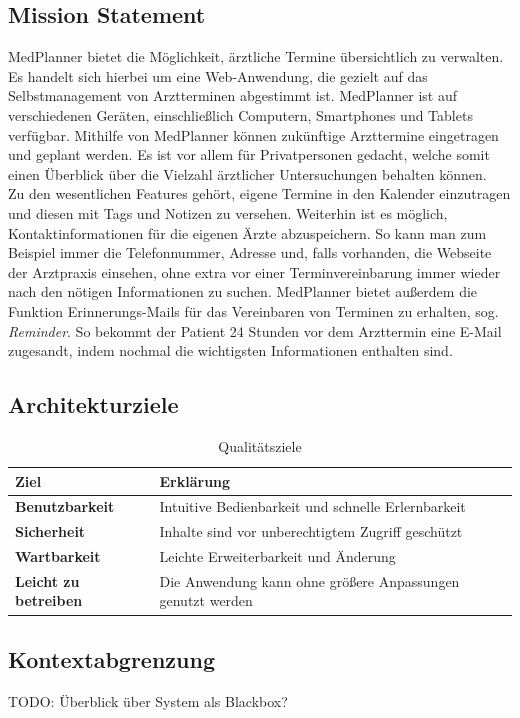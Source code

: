 \documentclass[conference]{IEEEtran}
\begin{document}
\subsection{Mission Statement}
MedPlanner bietet die Möglichkeit, ärztliche Termine übersichtlich zu verwalten. Es handelt sich hierbei um eine Web-Anwendung, die gezielt auf das Selbstmanagement von Arztterminen abgestimmt ist. MedPlanner ist auf verschiedenen Geräten, einschließlich Computern, Smartphones und Tablets verfügbar. Mithilfe von MedPlanner können zukünftige Arzttermine eingetragen und geplant werden. Es ist vor allem für Privatpersonen gedacht, welche somit einen Überblick über die Vielzahl ärztlicher Untersuchungen behalten können.\\
Zu den wesentlichen Features gehört, eigene Termine in den Kalender einzutragen und diesen mit Tags und Notizen zu versehen. Weiterhin ist es möglich, Kontaktinformationen für die eigenen Ärzte abzuspeichern. So kann man zum Beispiel immer die Telefonnummer, Adresse und, falls vorhanden, die Webseite der Arztpraxis einsehen, ohne extra vor einer Terminvereinbarung immer wieder nach den nötigen Informationen zu suchen. MedPlanner bietet außerdem die Funktion Erinnerungs-Mails für das Vereinbaren von Terminen zu erhalten, sog. \textit{Reminder}. So bekommt der Patient 24 Stunden vor dem Arzttermin eine E-Mail zugesandt, indem nochmal die wichtigsten Informationen enthalten sind. 


\subsection{Architekturziele}
\begin{table}[!h]
	\caption{Qualitätsziele}
	\begin{tabularx}{\columnwidth}{>{\bfseries}l|p{57mm}}
		\toprule
		\textbf{Ziel} & Erklärung\\
		\midrule
		Benutzbarkeit & Intuitive Bedienbarkeit und schnelle Erlernbarkeit\\
		Sicherheit & Inhalte sind vor unberechtigtem Zugriff geschützt\\
		Wartbarkeit & Leichte Erweiterbarkeit und Änderung\\
		Leicht zu betreiben & Die Anwendung kann ohne größere Anpassungen genutzt werden\\
		\bottomrule
	\end{tabularx}
\end{table}

\subsection{Kontextabgrenzung}
TODO: Überblick über System als Blackbox?
\end{document}

